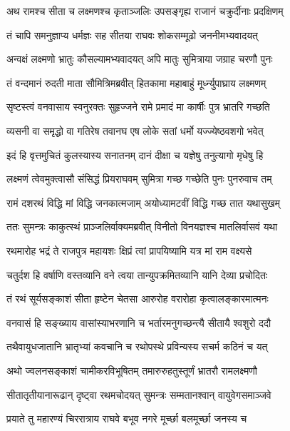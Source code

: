
\twolineshloka
{अथ रामश्च सीता च लक्ष्मणश्च कृताञ्जलिः}
{उपसङ्गृह्य राजानं चक्रुर्दीनाः प्रदक्षिणम्} %

\twolineshloka
{तं चापि समनुज्ञाप्य धर्मज्ञः सह सीतया}
{राघवः शोकसम्मूढो जननीमभ्यवादयत्} %

\twolineshloka
{अन्वक्षं लक्ष्मणो भ्रातुः कौसल्यामभ्यवादयत्}
{अपि मातुः सुमित्राया जग्राह चरणौ पुनः} %

\twolineshloka
{तं वन्दमानं रुदती माता सौमित्रिमब्रवीत्}
{हितकामा महाबाहुं मूर्ध्न्युपाघ्राय लक्ष्मणम्} %

\twolineshloka
{सृष्टस्त्वं वनवासाय स्वनुरक्तः सुहृज्जने}
{रामे प्रमादं मा कार्षीः पुत्र भ्रातरि गच्छति} %

\twolineshloka
{व्यसनी वा समृद्धो वा गतिरेष तवानघ}
{एष लोके सतां धर्मो यज्ज्येष्ठवशगो भवेत्} %

\twolineshloka
{इदं हि वृत्तमुचितं कुलस्यास्य सनातनम्}
{दानं दीक्षा च यज्ञेषु तनुत्यागो मृधेषु हि} %

\twolineshloka
{लक्ष्मणं त्वेवमुक्त्वासौ संसिद्धं प्रियराघवम्}
{सुमित्रा गच्छ गच्छेति पुनः पुनरुवाच तम्} %

\twolineshloka
{रामं दशरथं विद्धि मां विद्धि जनकात्मजाम्}
{अयोध्यामटवीं विद्धि गच्छ तात यथासुखम्} %

\twolineshloka
{ततः सुमन्त्रः काकुत्स्थं प्राञ्जलिर्वाक्यमब्रवीत्}
{विनीतो विनयज्ञश्च मातलिर्वासवं यथा} %

\twolineshloka
{रथमारोह भद्रं ते राजपुत्र महायशः}
{क्षिप्रं त्वां प्रापयिष्यामि यत्र मां राम वक्ष्यसे} %

\twolineshloka
{चतुर्दश हि वर्षाणि वस्तव्यानि वने त्वया}
{तान्युपक्रमितव्यानि यानि देव्या प्रचोदितः} %

\twolineshloka
{तं रथं सूर्यसङ्काशं सीता हृष्टेन चेतसा}
{आरुरोह वरारोहा कृत्वालङ्कारमात्मनः} %

\twolineshloka
{वनवासं हि सङ्ख्याय वासांस्याभरणानि च}
{भर्तारमनुगच्छन्त्यै सीतायै श्वशुरो ददौ} %

\twolineshloka
{तथैवायुधजातानि भ्रातृभ्यां कवचानि च}
{रथोपस्थे प्रविन्यस्य सचर्म कठिनं च यत्} %

\twolineshloka
{अथो ज्वलनसङ्काशं चामीकरविभूषितम्}
{तमारुरुहतुस्तूर्णं भ्रातरौ रामलक्ष्मणौ} %

\twolineshloka
{सीतातृतीयानारूढान् दृष्ट्वा रथमचोदयत्}
{सुमन्त्रः सम्मतानश्वान् वायुवेगसमाञ्जवे} %

\twolineshloka
{प्रयाते तु महारण्यं चिररात्राय राघवे}
{बभूव नगरे मूर्च्छा बलमूर्च्छा जनस्य च} %

